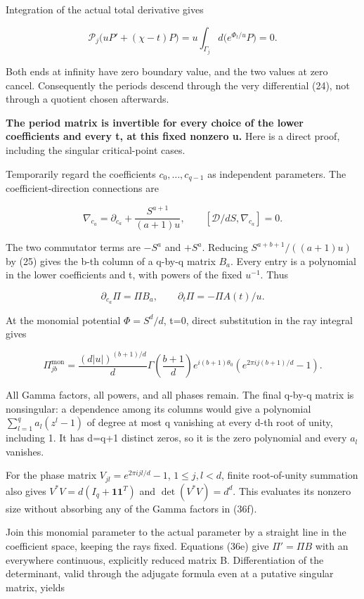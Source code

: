 Integration of the actual total derivative gives

\[
\mathcal P_j\bigl(uP'+(\chi-t)P\bigr)
=u\int_{\Gamma_j}d\bigl(e^{\Phi_t/u}P\bigr)=0.
\tag{36c}
\]

Both ends at infinity have zero boundary value, and the two values at zero cancel. Consequently the periods descend through the very differential (24), not through a quotient chosen afterwards.

\textbf{The period matrix is invertible for every choice of the lower coefficients and every t, at this fixed nonzero u.} Here is a direct proof, including the singular critical-point cases.

Temporarily regard the coefficients \(c_0,\ldots,c_{q-1}\) as independent parameters. The coefficient-direction connections are

\[
\nabla_{c_a}=\partial_{c_a}+\frac{S^{a+1}}{(a+1)u},
\qquad [\mathcal D/dS,\nabla_{c_a}]=0.
\tag{36d}
\]

The two commutator terms are \(-S^a\) and \(+S^a\). Reducing \(S^{a+b+1}/((a+1)u)\) by (25) gives the b-th column of a q-by-q matrix \(B_a\). Every entry is a polynomial in the lower coefficients and t, with powers of the fixed \(u^{-1}\). Thus

\[
\partial_{c_a}\Pi=\Pi B_a,\qquad
\partial_t\Pi=-\Pi A(t)/u.
\tag{36e}
\]

At the monomial potential \(\Phi=S^d/d\), t=0, direct substitution in the ray integral gives

\[
\Pi_{jb}^{\mathrm{mon}}
=\frac{(d|u|)^{(b+1)/d}}{d}
\Gamma\!\left(\frac{b+1}{d}\right)
 e^{i(b+1)\theta_0}
 \left(e^{2\pi i j(b+1)/d}-1\right).
\tag{36f}
\]

All Gamma factors, all powers, and all phases remain. The final q-by-q matrix is nonsingular: a dependence among its columns would give a polynomial \(\sum_{l=1}^{q}a_l(z^l-1)\) of degree at most q vanishing at every d-th root of unity, including 1. It has d=q+1 distinct zeros, so it is the zero polynomial and every \(a_l\) vanishes.

For the phase matrix \(V_{jl}=e^{2\pi i jl/d}-1\), \(1\le j,l<d\), finite root-of-unity summation also gives \(V^*V=d(I_q+\mathbf1\mathbf1^T)\) and \(\det(V^*V)=d^d\). This evaluates its nonzero size without absorbing any of the Gamma factors in (36f).

Join this monomial parameter to the actual parameter by a straight line in the coefficient space, keeping the rays fixed. Equations (36e) give \(\Pi'=\Pi B\) with an everywhere continuous, explicitly reduced matrix B. Differentiation of the determinant, valid through the adjugate formula even at a putative singular matrix, yields

